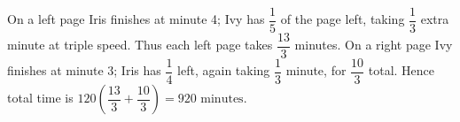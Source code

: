 On a left page Iris finishes at minute 4; Ivy has $\dfrac{1}{5}$ of the page left, taking $\dfrac{1}{3}$ extra minute at triple speed. Thus each left page takes $\dfrac{13}{3}$ minutes. On a right page Ivy finishes at minute 3; Iris has $\dfrac{1}{4}$ left, again taking $\dfrac{1}{3}$ minute, for $\dfrac{10}{3}$ total. Hence total time is $120(\dfrac{13}{3}+\dfrac{10}{3})=\boxed{920\text{ minutes}}$.
